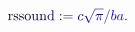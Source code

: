 \documentclass[12pt]{article}
\begin{document}
\makeatletter
\renewcommand*{\@textcolor}[3]{%
  \protect\leavevmode
  \begingroup
    \color#1{#2}#3%
  \endgroup
}
\makeatother
\begin{displaymath}
\mathrm { \mathcolor[RGB]{0,0,15}{r} \mathcolor[RGB]{0,0,30}{s} \mathcolor[RGB]{0,0,45}{s} \mathcolor[RGB]{0,0,60}{o} \mathcolor[RGB]{0,0,75}{u} \mathcolor[RGB]{0,0,90}{n} \mathcolor[RGB]{0,0,105}{d} } \mathcolor[RGB]{0,0,120}{:} \mathcolor[RGB]{0,0,135}{=} \mathcolor[RGB]{0,0,150}{c} \mathcolor[RGB]{0,0,165}{\sqrt { \mathcolor[RGB]{0,0,180}{\pi} } } \mathcolor[RGB]{0,0,195}{/} \mathcolor[RGB]{0,0,210}{b} \mathcolor[RGB]{0,0,225}{a} \mathcolor[RGB]{0,0,240}{.}
\end{displaymath}
\end{document}
